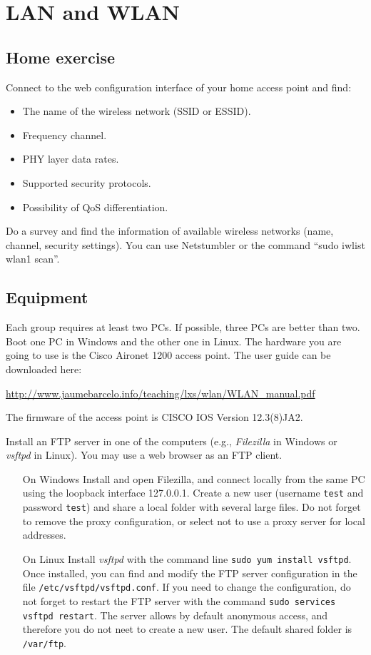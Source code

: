 \chapter{LAN and WLAN}

\section{Home exercise}

Connect to the web configuration interface of your home access point and find:
\begin{itemize}
\item The name of the wireless network (SSID or ESSID).
\item Frequency channel.
\item PHY layer data rates.
\item Supported security protocols.
\item Possibility of QoS differentiation.
\end{itemize}

Do a survey and find the information of available wireless networks (name, channel, security settings).
You can use Netstumbler or the command ``sudo iwlist wlan1 scan''.

\section{Equipment}

Each group requires at least two PCs.
If possible, three PCs are better than two.
Boot one PC in Windows and the other one in Linux.
The hardware you are going to use is the Cisco Aironet 1200 access point.
The user guide can be downloaded here: 

\url{http://www.jaumebarcelo.info/teaching/lxs/wlan/WLAN_manual.pdf}

The firmware of the access point is CISCO IOS Version 12.3(8)JA2.

Install an FTP server in one of the computers (e.g., \emph{Filezilla} in Windows or \emph{vsftpd} in Linux). You may use a web browser as an FTP client.

\begin{itemize}

\item[On Windows] Install and open Filezilla, and connect locally from the same PC using the loopback interface 127.0.0.1. Create a new user (username \texttt{test} and password \texttt{test}) and share a local folder with several large files. Do not forget to remove the proxy configuration, or select not to use a proxy server for local addresses.

\item[On Linux] Install \emph{vsftpd} with the command line \texttt{sudo yum install vsftpd}. Once installed, you can find and modify the FTP server configuration in the file \texttt{/etc/vsftpd/vsftpd.conf}. If you need to change the configuration, do not forget to restart the FTP server with the command \texttt{sudo services vsftpd restart}. The server allows by default anonymous access, and therefore you do not neet to create a new user. The default shared folder is \texttt{/var/ftp}.

\end{itemize}

